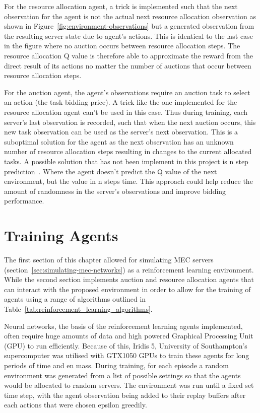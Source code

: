 For the resource allocation agent, a trick is implemented such that the next observation for the agent is not the
actual next resource allocation observation as shown in Figure~\ref{fig:environment-observations} but a generated
observation from the resulting server state due to agent's actions. This is identical to the last case in the figure
where no auction occurs between resource allocation steps. The resource allocation Q value is therefore able to
approximate the reward from the direct result of its actions no matter the number of auctions that occur between
resource allocation steps.

For the auction agent, the agent's observations require an auction task to select an action (the task bidding price).
A trick like the one implemented for the resource allocation agent can't be used in this case. Thus during training,
each server's last observation is recorded, such that when the next auction occurs, this new task observation can be
used as the server's next observation. This is a suboptimal solution for the agent as the next observation
has an unknown number of resource allocation steps resulting in changes to the current allocated tasks.
A possible solution that has not been implement in this project is n step prediction~\citep{multi-step-dqn}. Where the
agent doesn't predict the Q value of the next environment, but the value in n steps time. This approach could help
reduce the amount of randomness in the server's observations and improve bidding performance.

\section{Training Agents}
\label{sec:training-agents}
The first section of this chapter allowed for simulating MEC servers
(section~\ref{sec:simulating-mec-networks}) as a reinforcement learning environment. While the second
section implements auction and resource allocation agents that can interact with the proposed environment in order
to allow for the training of agents using a range of algorithms outlined in
Table~\ref{tab:reinforcement_learning_algorithms}.

Neural networks, the basis of the reinforcement learning agents implemented, often require huge amounts of data and
high powered Graphical Processing Unit (GPU) to run efficiently. Because of this, Iridis 5, University of Southampton's
supercomputer was utilised with GTX1050 GPUs to train these agents for long periods of time and en mass. During training,
for each episode a random environment was generated from a list of possible settings so that the agents would be allocated
to random servers. The environment was run until a fixed set time step, with the agent observation being added to their replay
buffers after each actions that were chosen epsilon greedily.

